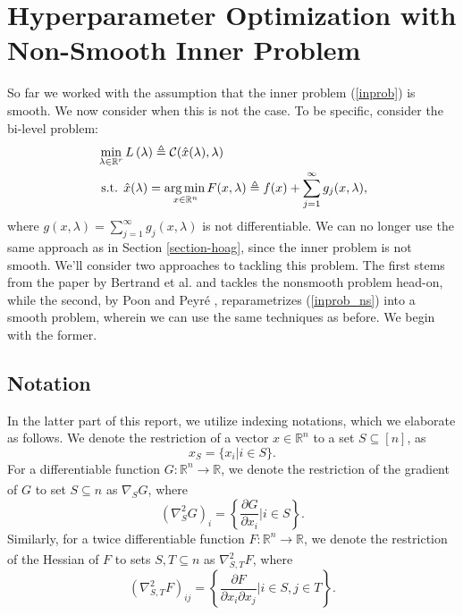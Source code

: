 \documentclass[11pt, twoside]{report}
\begin{document}
\section{Hyperparameter Optimization with Non-Smooth Inner Problem}
\label{section-hoag_nonsmooth}

So far we worked with the assumption that the inner problem (\ref{inprob}) is smooth. %
We now consider when this is not the case. To be specific, consider the bi-level problem:
\begin{align} 
&\min _{\lambda \in \mathbb{R}^r} L\left(\lambda \right) \triangleq \mathcal{C}(\hat{x}(\lambda),\lambda) \label{bilev_ns1}\\
&\text { s.t. } \hat{x}(\lambda) =\underset{x \in \mathbb{R}^{n}} {\operatorname*{arg\, min \,}} {F(x,\lambda) \triangleq f(x) + \sum_{j=1}^\infty g_j(x,\lambda)} \label{inprob_ns},
\end{align}
where $g(x,\lambda) = \sum_{j=1}^\infty g_j(x,\lambda)$ is not differentiable. We can no longer use the same approach as in Section \ref{section-hoag}, since the inner problem is not smooth. We'll consider two approaches to tackling this problem. The first stems from the paper by Bertrand et al. \cite{bertrand2022implicit} and tackles the nonsmooth problem head-on, while the second, by Poon and Peyr\'{e} \cite{poon}, reparametrizes (\ref{inprob_ns}) into a smooth problem, wherein we can use the same techniques as before. We begin with the former.

\subsection{Notation}
In the latter part of this report, we utilize indexing notations, which we elaborate as follows. We denote the restriction of a vector $x \in \mathbb{R}^n$ to a set $S \subseteq [n]$, as
\[x_S = \{x_i | i \in S\}.\]
For a differentiable function $G:\mathbb{R}^n \xrightarrow[]{} \mathbb{R}$, we denote the restriction of the gradient of $G$ to set $S \subseteq n$ as $\nabla_{S} G$, where
\[\left(\nabla^2_{S} G \right)_{i} = \left\{\frac{\partial G}{\partial x_i} \bigg| i \in S \right\}.\]
Similarly, for a twice differentiable function $F:\mathbb{R}^n \xrightarrow[]{} \mathbb{R}$, we denote the restriction of the Hessian of $F$ to sets $S,T \subseteq n$ as $\nabla^2_{S,T} F$, where
\[\left(\nabla^2_{S,T} F \right)_{ij} = \left\{\frac{\partial F}{\partial x_i \partial x_j} \bigg| i \in S, j \in T \right\}.\]
\end{document}
